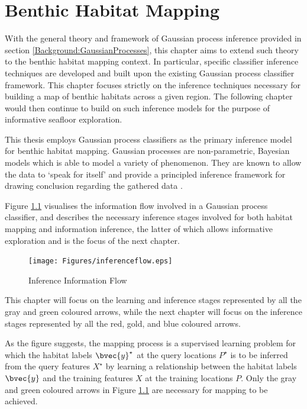 \chapter{Benthic Habitat Mapping}
\label{BenthicHabitatMapping}
	
	 With the general theory and framework of Gaussian process inference provided in section \ref{Background:GaussianProcesses}, this chapter aims to extend such theory to the benthic habitat mapping context. In particular, specific classifier inference techniques are developed and built upon the existing Gaussian process classifier framework. This chapter focuses strictly on the inference techniques necessary for building a map of benthic habitats across a given region. The following chapter would then continue to build on such inference models for the purpose of informative seafloor exploration. 
	
		This thesis employs Gaussian process classifiers as the primary inference model for benthic habitat mapping. Gaussian processes are non-parametric, Bayesian models which is able to model a variety of phenomenon. They are known to allow the data to `speak for itself' and provide a principled inference framework for drawing conclusion regarding the gathered data \citep{GaussianProcessForMachineLearning}. 
		
		Figure \ref{Figure:InferenceFlow} visualises the information flow involved in a Gaussian process classifier, and describes the necessary inference stages involved for both habitat mapping and information inference, the latter of which allows informative exploration and is the focus of the next chapter.

		\begin{figure}[!htbp]
		\centering
			\texttt{[image: Figures/inferenceflow.eps]}
		\caption{Inference Information Flow}
		\label{Figure:InferenceFlow}
		\end{figure}	
				
		This chapter will focus on the learning and inference stages represented by all the {\color{Gray} gray} and {\color{ForestGreen} green} coloured arrows, while the next chapter will focus on the inference stages represented by all the {\color{OrangeRed} red}, {\color{YellowOrange} gold}, and {\color{Cerulean} blue} coloured arrows.
		
		As the figure suggests, the mapping process is a supervised learning problem for which the habitat labels $\bvec{y}^{\star}$ at the query locations $P^{\star}$ is to be inferred from the query features $X^{\star}$ by learning a relationship between the habitat labels $\bvec{y}$ and the training features $X$ at the training locations $P$. Only the {\color{Gray} gray} and {\color{ForestGreen} green} coloured arrows in Figure \ref{Figure:InferenceFlow} are necessary for mapping to be achieved.
		
